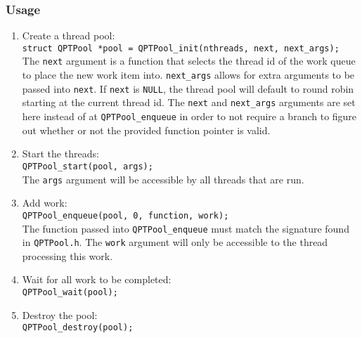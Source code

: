\subsubsection{Usage}
\begin{enumerate}
\item Create a thread pool: \\ \texttt{struct QPTPool *pool =
  QPTPool\_init(nthreads, next, next\_args);} \\ The \texttt{next}
  argument is a function that selects the thread id of the work queue
  to place the new work item into. \texttt{next\_args} allows for
  extra arguments to be passed into \texttt{next}. If \texttt{next} is
  \texttt{NULL}, the thread pool will default to round robin starting
  at the current thread id. The \texttt{next} and \texttt{next\_args}
  arguments are set here instead of at \texttt{QPTPool\_enqueue} in
  order to not require a branch to figure out whether or not the
  provided function pointer is valid.
\item Start the threads: \\ \texttt{QPTPool\_start(pool, args);}
  \\ The \texttt{args} argument will be accessible by all threads that
  are run.
\item Add work: \\ \texttt{QPTPool\_enqueue(pool, 0, function,
  work);} \\ The function passed into \texttt{QPTPool\_enqueue} must
  match the signature found in \texttt{QPTPool.h}. The \texttt{work}
  argument will only be accessible to the thread processing this work.
\item Wait for all work to be completed:
  \\ \texttt{QPTPool\_wait(pool);}
\item Destroy the pool: \\ \texttt{QPTPool\_destroy(pool);}
\end{enumerate}
